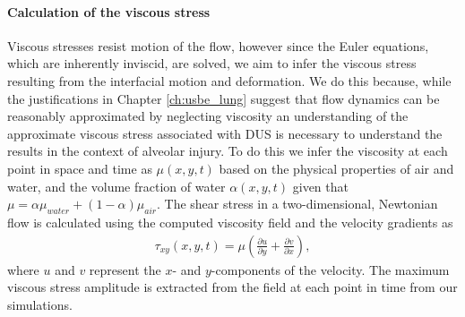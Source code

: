 \paragraph*{Calculation of the viscous stress}
Viscous stresses resist motion of the flow, however since the Euler
equations, which are inherently inviscid, are solved, we aim to infer
the viscous stress resulting from the interfacial motion and
deformation. We do this because, while the justifications in Chapter
\ref{ch:usbe_lung} suggest that flow dynamics can be reasonably
approximated by neglecting viscosity an understanding of the
approximate viscous stress associated with \ac{DUS} is necessary to
understand the results in the context of alveolar injury. To do this
we infer the viscosity at each point in space and time as $\mu(x,y,t)$
based on the physical properties of air and water, and the volume
fraction of water $\alpha(x,y,t)$ given that
$\mu = \alpha\mu_{water} + (1-\alpha)\mu_{air}$. The shear stress in a
two-dimensional, Newtonian flow is calculated using the computed
viscosity field and the velocity gradients as
\begin{align}
  \tau_{xy}(x,y,t) = \mu\left(\frac{\partial u}{\partial y}+ \frac{\partial v}{\partial x}\right),
\end{align}
where $u$ and $v$ represent the $x$- and $y$-components of the
velocity. The maximum viscous stress amplitude is extracted from the
field at each point in time from our simulations.
% 

% 

